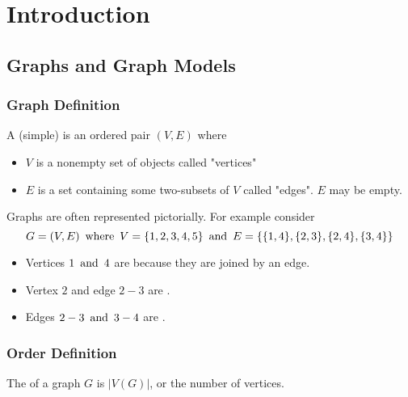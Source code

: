 \section{Introduction}

\subsection{Graphs and Graph Models}

\subsubsection*{Graph Definition}
A (simple)  is an ordered pair $(V,E)$ where
\begin{itemize}
    \item $V$ is a nonempty set of objects called "vertices"
    \item $E$ is a set containing some two-subsets of $V$ called "edges". $E$ may be empty.
\end{itemize}

Graphs are often represented pictorially. For example consider
\[
    G = (V,E) \operatorname{~\text{where}~} V = \{1,2,3,4,5\} \operatorname{~\text{and}~} E = \{\{1,4\},\{2,3\},\{2,4\},\{3,4\}\}
\]

\begin{center}
\end{center}
\begin{itemize}
\item Vertices $1 \operatorname{~\text{and}~} 4$ are  because they are joined by an edge.
    \item Vertex $2$ and edge $2-3$ are .
    \item Edges $2-3 \operatorname{~\text{and}~} 3-4$ are .
\end{itemize}

\subsubsection*{Order Definition}
The  of a graph $G$ is $|V(G)|$, or the number of vertices.

